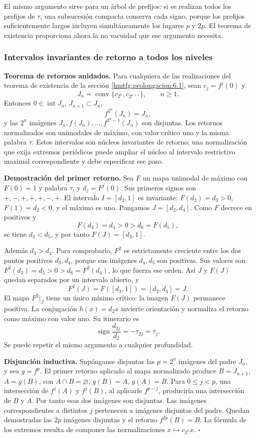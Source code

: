 El mismo argumento sirve para un árbol de prefijos: si se realizan todos los prefijos de \(\tau\), una subsucesión compacta conserva cada signo, porque los prefijos suficientemente largos incluyen simultáneamente los lugares \(p\) y \(2p\). El teorema de existencia proporciona ahora la no vacuidad que ese argumento necesita.

\subsubsection{Intervalos invariantes de retorno a todos los niveles}
\label{hmtfg:prolongacion:6.3}

\textbf{Teorema de retornos anidados.} Para cualquiera de las realizaciones del teorema de existencia de la sección \ref{hmtfg:prolongacion:6.1}, sean \(c_j=f^j(0)\) y
\[
J_n=\operatorname{conv}\{c_{2^n},c_{2^{n+1}}\},\qquad n\ge1.
\]
Entonces \(0\in\operatorname{int}J_n\), \(J_{n+1}\subset J_n\),
\[
f^{2^n}(J_n)=J_n,
\]
y las \(2^n\) imágenes \(J_n,f(J_n),\ldots,f^{2^n-1}(J_n)\) son disjuntas. Los retornos normalizados son unimodales de máximo, con valor crítico uno y la misma palabra \(\tau\). Estos intervalos son núcleos invariantes de retorno; una normalización que exija extremos periódicos puede ampliar el núcleo al intervalo restrictivo maximal correspondiente y debe especificar ese paso.

\textbf{Demostración del primer retorno.} Sea \(F\) un mapa unimodal de máximo con \(F(0)=1\) y palabra \(\tau\), y \(d_j=F^j(0)\). Sus primeros signos son \(+,-,+,+,+,-,+\). El intervalo \(I=[d_2,1]\) es invariante: \(F(d_2)=d_3>0\), \(F(1)=d_2<0\), y el máximo es uno. Pongamos \(J=[d_2,d_4]\). Como \(F\) decrece en positivos y
\[
F(d_3)=d_4>0> d_6=F(d_5),
\]
se tiene \(d_3<d_5\), y por tanto \(F(J)=[d_3,1]\).

Además \(d_3>d_4\). Para comprobarlo, \(F^2\) es estrictamente creciente entre los dos puntos positivos \(d_3,d_4\), porque sus imágenes \(d_4,d_5\) son positivas. Sus valores son \(F^2(d_3)=d_5>0>d_6=F^2(d_4)\), lo que fuerza ese orden. Así \(J\) y \(F(J)\) quedan separados por un intervalo abierto, y
\[
F^2(J)=F([d_3,1])=[d_2,d_4]=J.
\]
El mapa \(F^2|_J\) tiene un único mínimo crítico: la imagen \(F(J)\) permanece positiva. La conjugación \(h(x)=d_2x\) invierte orientación y normaliza el retorno como máximo con valor uno. Su itinerario es
\[
\operatorname{sign}\frac{d_{2j}}{d_2}
=-\tau_{2j}=\tau_j.
\]
Se puede repetir el mismo argumento a cualquier profundidad.

\textbf{Disjunción inductiva.} Supónganse disjuntas las \(p=2^n\) imágenes del padre \(J_n\), y sea \(g=f^p\). El primer retorno aplicado al mapa normalizado produce \(B=J_{n+1}\), \(A=g(B)\), con \(A\cap B=\varnothing\), \(g(B)=A\), \(g(A)=B\). Para \(0\le j<p\), una intersección de \(f^j(A)\) y \(f^j(B)\), al aplicarle \(f^{p-j}\), produciría una intersección de \(B\) y \(A\). Por tanto esas dos imágenes son disjuntas. Las imágenes correspondientes a distintos \(j\) pertenecen a imágenes disjuntas del padre. Quedan demostradas las \(2p\) imágenes disjuntas y el retorno \(f^{2p}(B)=B\). La fórmula de los extremos resulta de componer las normalizaciones \(x\mapsto c_{2^n}x\). \(\square\)

